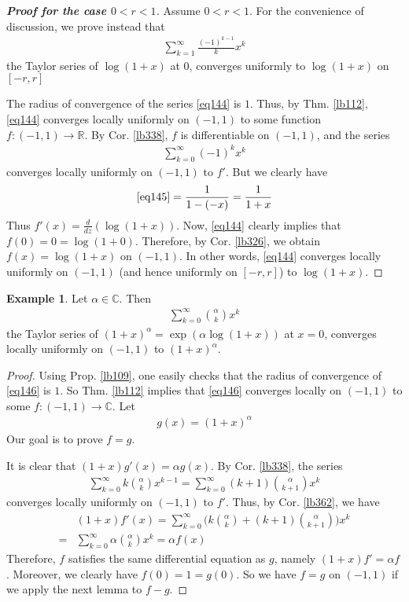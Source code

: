 \documentclass[12pt,b5paper,notitlepage]{article}
\theoremstyle{definition}
\newtheorem{eg}[df]{Example}
\theoremstyle{plain}
\newcommand{\Cbb}{\mathbb C}
\newcommand{\Rbb}{\mathbb R}
\numberwithin{equation}{section}
\begin{document}
\begin{proof}[\textbf{Proof for the case $0<r<1$}]
Assume $0<r<1$. For the convenience of discussion, we prove instead that 
\begin{align}
\sum_{k=1}^\infty \frac{(-1)^{k-1}}{k} x^k  \label{eq144}
\end{align}
the Taylor series of $\log(1+x)$ at $0$, converges uniformly to $\log(1+x)$ on $[-r,r]$

The radius of convergence of the series \eqref{eq144} is $1$. Thus, by Thm. \ref{lb112}, \eqref{eq144} converges locally uniformly on $(-1,1)$ to some function $f:(-1,1)\rightarrow\Rbb$. By Cor. \ref{lb338}, $f$ is differentiable on $(-1,1)$, and the series
\begin{align}
\sum_{k=0}^\infty (-1)^kx^k   \label{eq145}
\end{align}
converges locally uniformly on $(-1,1)$ to $f'$. But we clearly have
\begin{align}
\eqref{eq145}=\frac{1}{1-(-x)}=\frac 1{1+x}
\end{align}
Thus $f'(x)=\frac d{dz}(\log(1+x))$. Now, \eqref{eq144} clearly implies that $f(0)=0=\log(1+0)$. Therefore, by Cor. \ref{lb326}, we obtain $f(x)=\log(1+x)$ on $(-1,1)$. In other words, \eqref{eq144} converges locally uniformly on $(-1,1)$ (and hence uniformly on $[-r,r]$) to $\log(1+x)$.
\end{proof}



\begin{eg}
Let $\alpha\in\Cbb$. Then
\begin{align}
\sum_{k=0}^\infty{\alpha\choose k}x^k   \label{eq146}
\end{align}
the Taylor series of $(1+x)^\alpha=\exp(\alpha\log(1+x))$ at $x=0$, converges locally uniformly on $(-1,1)$ to $(1+x)^\alpha$.
\end{eg}


\begin{proof}
Using Prop. \ref{lb109}, one easily checks that the radius of convergence of \eqref{eq146} is $1$. So Thm. \ref{lb112} implies that \eqref{eq146} converges locally on $(-1,1)$ to some $f:(-1,1)\rightarrow\Cbb$. Let
\begin{align*}
g(x)=(1+x)^\alpha
\end{align*}
Our goal is to prove $f=g$. 

It is clear that $(1+x)g'(x)=\alpha g(x)$. By Cor. \ref{lb338},  the series
\begin{align}
\sum_{k=0}^\infty k{\alpha\choose k}x^{k-1}=\sum_{k=0}^\infty (k+1){\alpha\choose k+1}x^k
\end{align}
converges locally uniformly on $(-1,1)$ to $f'$. Thus, by Cor. \ref{lb362}, we have
\begin{align*}
&(1+x)f'(x)=\sum_{k=0}^\infty \bigg( k{\alpha\choose k}+(k+1){\alpha\choose k+1}\bigg)x^k\\
=&\sum_{k=0}^\infty \alpha{\alpha\choose k}x^k=\alpha f(x)
\end{align*}
Therefore, $f$ satisfies the same differential equation as $g$, namely $(1+x)f'=\alpha f$. Moreover, we clearly have $f(0)=1=g(0)$. So we have $f=g$ on $(-1,1)$ if we apply the next lemma to $f-g$.
\end{proof}
\end{document}
